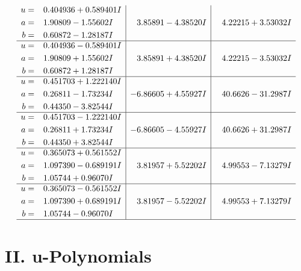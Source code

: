 \documentclass[1p]{elsarticle_modified}
\theoremstyle{definition}
\begin{document}
$$\begin{array}{c|c|c}
\begin{aligned}
u &= \phantom{-}0.404936 + 0.589401 I \\
a &= \phantom{-}1.90809 - 1.55602 I \\
b &= \phantom{-}0.60872 - 1.28187 I\end{aligned}
 & \phantom{-}3.85891 - 4.38520 I & \phantom{-}4.22215 + 3.53032 I \\ \hline\begin{aligned}
u &= \phantom{-}0.404936 - 0.589401 I \\
a &= \phantom{-}1.90809 + 1.55602 I \\
b &= \phantom{-}0.60872 + 1.28187 I\end{aligned}
 & \phantom{-}3.85891 + 4.38520 I & \phantom{-}4.22215 - 3.53032 I \\ \hline\begin{aligned}
u &= \phantom{-}0.451703 + 1.222140 I \\
a &= \phantom{-}0.26811 - 1.73234 I \\
b &= \phantom{-}0.44350 - 3.82544 I\end{aligned}
 & -6.86605 + 4.55927 I & \phantom{-}40.6626 - 31.2987 I \\ \hline\begin{aligned}
u &= \phantom{-}0.451703 - 1.222140 I \\
a &= \phantom{-}0.26811 + 1.73234 I \\
b &= \phantom{-}0.44350 + 3.82544 I\end{aligned}
 & -6.86605 - 4.55927 I & \phantom{-}40.6626 + 31.2987 I \\ \hline\begin{aligned}
u &= \phantom{-}0.365073 + 0.561552 I \\
a &= \phantom{-}1.097390 - 0.689191 I \\
b &= \phantom{-}1.05744 + 0.96070 I\end{aligned}
 & \phantom{-}3.81957 + 5.52202 I & \phantom{-}4.99553 - 7.13279 I \\ \hline\begin{aligned}
u &= \phantom{-}0.365073 - 0.561552 I \\
a &= \phantom{-}1.097390 + 0.689191 I \\
b &= \phantom{-}1.05744 - 0.96070 I\end{aligned}
 & \phantom{-}3.81957 - 5.52202 I & \phantom{-}4.99553 + 7.13279 I\\
 \hline 
 \end{array}$$\newpage
\newpage\renewcommand{\arraystretch}{1}
\centering \section*{ II. u-Polynomials}
\end{document}
